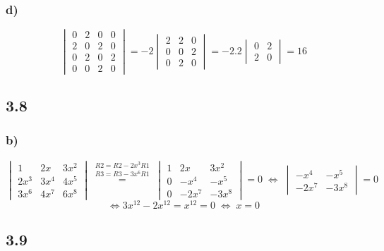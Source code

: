 \documentclass[11pt]{article}
\begin{document}
\subsubsection*{d)}
\[
\begin{vmatrix}
0 & 2 & 0 & 0 \\
2 & 0 & 2 & 0 \\
0 & 2 & 0 & 2 \\
0 & 0 & 2 & 0
\end{vmatrix}
=
-2\begin{vmatrix}
2 & 2 & 0\\
0 & 0 & 2\\
0 & 2 & 0
\end{vmatrix}
=-2.2\begin{vmatrix}
0 & 2 \\
2 & 0
\end{vmatrix}
=16
\]

\subsection*{3.8}
\subsubsection*{b)}
\[
\begin{vmatrix}
1 & 2x & 3x^2\\
2x^3 & 3x^4 & 4x^5\\
3x^6 & 4x^7 & 6x^8
\end{vmatrix}
\overset{\begin{matrix}
R2 = R2-2x^3R1\\
R3 = R3-3x^6R1
\end{matrix}}{=}
\begin{vmatrix}
1 & 2x & 3x^2\\
0 & -x^4 & -x^5\\
0 & -2x^7 & -3x^8
\end{vmatrix}
=0\;\Leftrightarrow\;
\begin{vmatrix}
-x^4 & -x^5\\
-2x^7 & -3x^8
\end{vmatrix}=0
\]
\[\Leftrightarrow 3x^12 - 2x^12 = x ^12 = 0\;
\Leftrightarrow\;x=0
\]

\subsection*{3.9}
\end{document}
